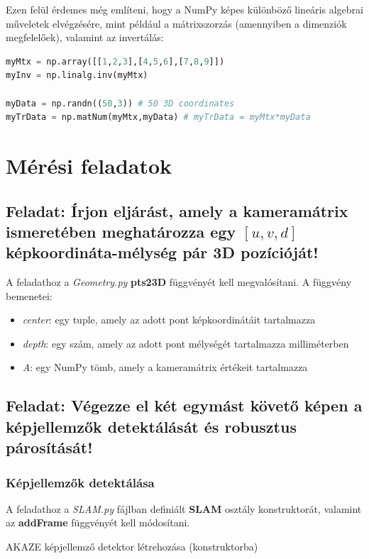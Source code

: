 \documentclass[12pt,a4paper,oneside]{report}             %
\begin{document}
Ezen felül érdemes még említeni, hogy a NumPy képes különböző lineáris algebrai műveletek elvégzésére, mint például a mátrixszorzás (amennyiben a dimenziók megfelelőek), valamint az invertálás:

\begin{lstlisting}[language=Python]
myMtx = np.array([[1,2,3],[4,5,6],[7,8,9]])
myInv = np.linalg.inv(myMtx)

myData = np.randn((50,3)) # 50 3D coordinates
myTrData = np.matNum(myMtx,myData) # myTrData = myMtx*myData
\end{lstlisting}

\chapter{Mérési feladatok}

\section{Feladat: Írjon eljárást, amely a kameramátrix ismeretében meghatározza egy $[u, v, d]$ képkoordináta-mélység pár 3D pozícióját!}

A feladathoz a \emph{Geometry.py} \textbf{pts23D} függvényét kell megvalósítani. A függvény bemenetei: 
\begin{itemize}
\item \emph{center}: egy tuple, amely az adott pont képkoordinátáit tartalmazza
\item \emph{depth}: egy szám, amely az adott pont mélységét tartalmazza milliméterben
\item \emph{A}: egy NumPy tömb, amely a kameramátrix értékeit tartalmazza
\end{itemize}

\section{Feladat: Végezze el két egymást követő képen a képjellemzők detektálását és robusztus párosítását!}

\subsection{Képjellemzők detektálása}

A feladathoz a \emph{SLAM.py} fájlban definiált \textbf{SLAM} osztály konstruktorát, valamint az \textbf{addFrame} függvényét kell módosítani.

AKAZE képjellemző detektor létrehozása (konstruktorba)
\end{document}

